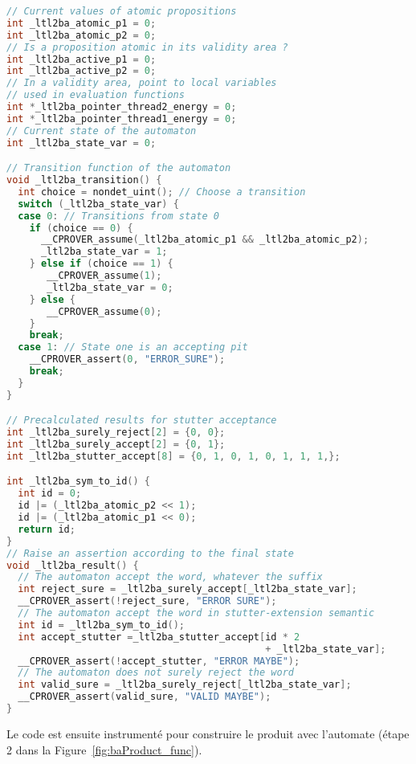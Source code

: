 \begin{lstlisting}[language=C, frame=single, caption=Automate encodé en C]
// Current values of atomic propositions
int _ltl2ba_atomic_p1 = 0;
int _ltl2ba_atomic_p2 = 0;
// Is a proposition atomic in its validity area ?
int _ltl2ba_active_p1 = 0;
int _ltl2ba_active_p2 = 0;
// In a validity area, point to local variables
// used in evaluation functions
int *_ltl2ba_pointer_thread2_energy = 0;
int *_ltl2ba_pointer_thread1_energy = 0;
// Current state of the automaton
int _ltl2ba_state_var = 0;

// Transition function of the automaton
void _ltl2ba_transition() {
  int choice = nondet_uint(); // Choose a transition
  switch (_ltl2ba_state_var) {
  case 0: // Transitions from state 0
    if (choice == 0) {
      __CPROVER_assume(_ltl2ba_atomic_p1 && _ltl2ba_atomic_p2);
      _ltl2ba_state_var = 1;
    } else if (choice == 1) {
       __CPROVER_assume(1);
       _ltl2ba_state_var = 0;
    } else {
       __CPROVER_assume(0);
    }
    break;
  case 1: // State one is an accepting pit
    __CPROVER_assert(0, "ERROR_SURE");
    break;
  }
}

// Precalculated results for stutter acceptance
int _ltl2ba_surely_reject[2] = {0, 0};
int _ltl2ba_surely_accept[2] = {0, 1};
int _ltl2ba_stutter_accept[8] = {0, 1, 0, 1, 0, 1, 1, 1,};

int _ltl2ba_sym_to_id() {
  int id = 0;
  id |= (_ltl2ba_atomic_p2 << 1);
  id |= (_ltl2ba_atomic_p1 << 0);
  return id;
}
// Raise an assertion according to the final state
void _ltl2ba_result() {
  // The automaton accept the word, whatever the suffix
  int reject_sure = _ltl2ba_surely_accept[_ltl2ba_state_var];
  __CPROVER_assert(!reject_sure, "ERROR SURE");
  // The automaton accept the word in stutter-extension semantic
  int id = _ltl2ba_sym_to_id();
  int accept_stutter =_ltl2ba_stutter_accept[id * 2
                                             + _ltl2ba_state_var];
  __CPROVER_assert(!accept_stutter, "ERROR MAYBE");
  // The automaton does not surely reject the word
  int valid_sure = _ltl2ba_surely_reject[_ltl2ba_state_var];
  __CPROVER_assert(valid_sure, "VALID MAYBE");
}
\end{lstlisting}

Le code est ensuite instrumenté pour construire le produit avec l'automate
(étape 2 dans la Figure~\ref{fig:baProduct_func}).

